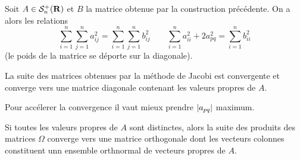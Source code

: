 \begin{thm}
	Soit $A \in \mathcal{S}^+_n(\mathbf{R})$ et $B$ la matrice obtenue par la construction précédente.
	On a alors les relations
	$$\sum_{i = 1}^n \sum_{j = 1}^n a_{ij}^2 = \sum_{i = 1}^n \sum_{j = 1}^n b_{ij}^2
	\qquad \sum_{i = 1}^n a_{ii}^2 + 2a_{pq}^2 = \sum_{i = 1}^n b_{ii}^2$$
	(le poids de la matrice se déporte sur la diagonale).
\end{thm}

\begin{thm}
	La suite des matrices obtenues par la méthode de Jacobi est convergente et converge vers une matrice diagonale contenant les valeurs propres de $A$.
\end{thm}

Pour accélerer la convergence il vaut mieux prendre $\left\lvert a_{pq}\right\rvert$ maximum.

\begin{thm}
	Si toutes les valeurs propres de $A$ sont distinctes, alors la suite des produits des matrices $\Omega$ converge vers une matrice orthogonale dont les vecteurs colonnes constituent unn ensemble orthnormal de vecteurs propres de $A$.
\end{thm}
